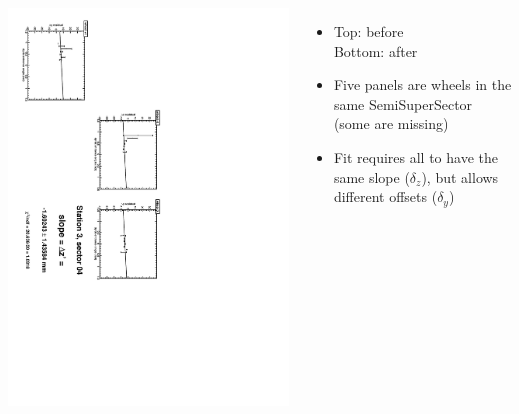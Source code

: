 \documentclass[compress]{beamer}
\begin{document}
\begin{frame}
\begin{columns}
\vfill
\includegraphics[height=\linewidth, angle=90]{zfits_after/zfit_3_04.pdf}
\begin{itemize}
\item Top: before \\ Bottom: after
\item Five panels are wheels in the same SemiSuperSector (some are missing)
\item Fit requires all to have the same slope ($\delta_z$), but allows different offsets ($\delta_y$)
\end{itemize}
\end{columns}
\end{frame}
\end{document}
